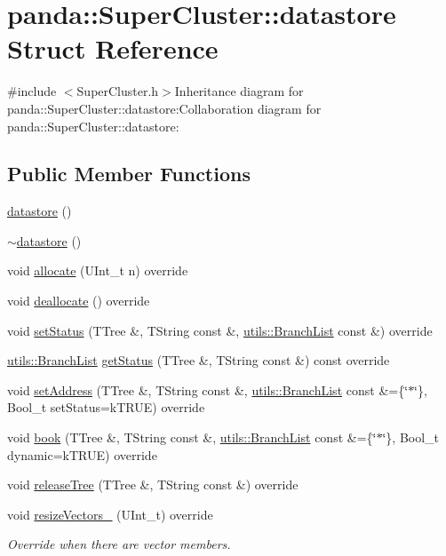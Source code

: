 \hypertarget{structpanda_1_1SuperCluster_1_1datastore}{
\section{panda::SuperCluster::datastore Struct Reference}
\label{structpanda_1_1SuperCluster_1_1datastore}
}


{\ttfamily \#include $<$SuperCluster.h$>$}Inheritance diagram for panda::SuperCluster::datastore:Collaboration diagram for panda::SuperCluster::datastore:\subsection*{Public Member Functions}
\begin{DoxyCompactItemize}
\item 
\hyperlink{structpanda_1_1SuperCluster_1_1datastore_a6c05d06e725e0b236f93d8f62bb4f6eb}{datastore} ()
\item 
\hyperlink{structpanda_1_1SuperCluster_1_1datastore_ad47081958ab7831bd7d6656e0655bbfd}{$\sim$datastore} ()
\item 
void \hyperlink{structpanda_1_1SuperCluster_1_1datastore_a24b328c94059debffe88149d5d4e8367}{allocate} (UInt\_\-t n) override
\item 
void \hyperlink{structpanda_1_1SuperCluster_1_1datastore_ab60c317f5aa9292d2d8340e38f19a482}{deallocate} () override
\item 
void \hyperlink{structpanda_1_1SuperCluster_1_1datastore_a266826bf3493fc0aada999aee9d86345}{setStatus} (TTree \&, TString const \&, \hyperlink{classpanda_1_1utils_1_1BranchList}{utils::BranchList} const \&) override
\item 
\hyperlink{classpanda_1_1utils_1_1BranchList}{utils::BranchList} \hyperlink{structpanda_1_1SuperCluster_1_1datastore_a24fa9e942bf46eb8d8a6b9499a8ef231}{getStatus} (TTree \&, TString const \&) const override
\item 
void \hyperlink{structpanda_1_1SuperCluster_1_1datastore_a01db9d8a69e180a102f3e7c56f95ff40}{setAddress} (TTree \&, TString const \&, \hyperlink{classpanda_1_1utils_1_1BranchList}{utils::BranchList} const \&=\{\char`\"{}$\ast$\char`\"{}\}, Bool\_\-t setStatus=kTRUE) override
\item 
void \hyperlink{structpanda_1_1SuperCluster_1_1datastore_a1dbbb1aef2d3af9c2771ad6a21570587}{book} (TTree \&, TString const \&, \hyperlink{classpanda_1_1utils_1_1BranchList}{utils::BranchList} const \&=\{\char`\"{}$\ast$\char`\"{}\}, Bool\_\-t dynamic=kTRUE) override
\item 
void \hyperlink{structpanda_1_1SuperCluster_1_1datastore_afc373864f03ba4e73ef1237f88bcfd4e}{releaseTree} (TTree \&, TString const \&) override
\item 
void \hyperlink{structpanda_1_1SuperCluster_1_1datastore_a8ca840d594bb0fd1168615b0ae11988f}{resizeVectors\_\-} (UInt\_\-t) override
\begin{DoxyCompactList}\small\item\em Override when there are vector members. \item\end{DoxyCompactList}\end{DoxyCompactItemize}


